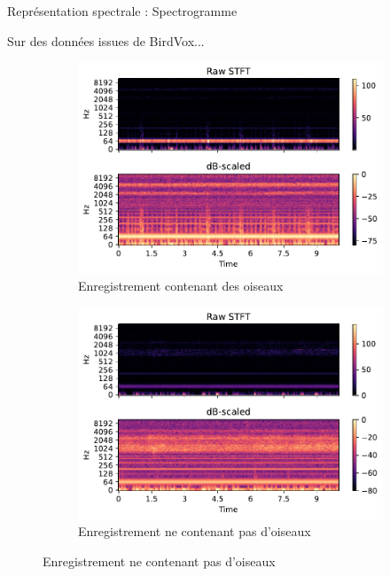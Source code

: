 \documentclass[compress,xcolor=table]{beamer}
\begin{document}
\begin{frame}{Représentation spectrale : Spectrogramme}

    Sur des données issues de BirdVox...

    \begin{figure}[ht]
        \centering
        \begin{subfigure}[b]{0.45\textwidth}
            \centering
            \includegraphics[width=\textwidth]{../images/audio/birds.spectrogram.birdvox.pdf}
            \caption{Enregistrement contenant des oiseaux}
            \label{fig:birds.spectrogram.birdvox}
        \end{subfigure}
        \hfill
        \begin{subfigure}[b]{0.45\textwidth}
            \centering
            \includegraphics[width=\textwidth]{../images/audio/nobirds.spectrogram.birdvox.pdf}
            \caption{Enregistrement ne contenant pas d'oiseaux}
            \label{fig:nobirds.spectrogram.birdvox}
        \end{subfigure}
    \end{figure}

\end{frame}
\end{document}
